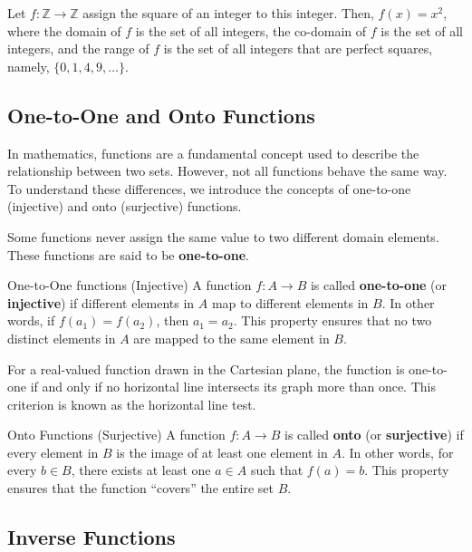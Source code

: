 \begin{example}
    Let $f: \mathbb{Z} \rightarrow \mathbb{Z}$ assign the square of an integer to this integer. Then, $f(x)=x^2$, where the domain of $f$ is the set of all integers, the co-domain of $f$ is the set of all integers, and the range of $f$ is the set of all integers that are perfect squares, namely, $\{0,1,4,9, \ldots\}$.
\end{example}

\subsection*{One-to-One and Onto Functions}
In mathematics, functions are a fundamental concept used to describe the relationship between two sets. However, not all functions behave the same way. To understand these differences, we introduce the concepts of one-to-one (injective) and onto (surjective) functions.

Some functions never assign the same value to two different domain elements. These functions are said to be \textbf{one-to-one}.

\begin{definition} {One-to-One functions (Injective)}
A function \( f: A \rightarrow B \) is called \textbf{one-to-one} (or \textbf{injective}) if different elements in \( A \) map to different elements in \( B \). In other words, if \( f(a_1) = f(a_2) \), then \( a_1 = a_2 \). This property ensures that no two distinct elements in \( A \) are mapped to the same element in \( B \).     
\end{definition}

For a real-valued function drawn in the Cartesian plane, the function is one-to-one if and only if no horizontal line intersects its graph more than once. This criterion is known as the horizontal line test.

\begin{definition}{Onto Functions (Surjective)}
A function \( f: A \rightarrow B \) is called \textbf{onto} (or \textbf{surjective}) if every element in \( B \) is the image of at least one element in \( A \). In other words, for every \( b \in B \), there exists at least one \( a \in A \) such that \( f(a) = b \). This property ensures that the function ``covers'' the entire set \( B \).
\end{definition}

\subsection*{Inverse Functions}

